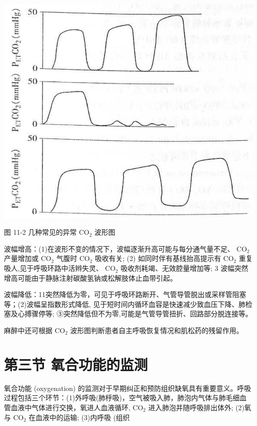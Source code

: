 \documentclass[10pt]{article}
\begin{document}
\begin{center}
\includegraphics[max width=\textwidth]{2024_07_09_002a177993bd97d1d6d7g-118(1)}
\end{center}

图 11-2 几种常见的异常 $\mathrm{CO}_{2}$ 波形图

波幅增高：(1)在波形不变的情况下，波幅逐渐升高可能与每分通气量不足、 $\mathrm{CO}_{2}$ 产量增加或 $\mathrm{CO}_{2}$ 气腹时 $\mathrm{CO}_{2}$ 吸收有关; (2) 如同时伴有基线抬高提示有 $\mathrm{CO}_{2}$ 重复吸人,见于呼吸环路中活辫失灵、 $\mathrm{CO}_{2}$ 吸收剂耗竭、无效腔量增加等; 3 波幅突然增高可能由于静脉注射碳酸氢钠或松解肢体止血带引起。

波幅降低：11突然降低为零，可见于呼吸环路断开、气管导管脱出或采样管阻塞等；(2)波幅呈指数形式降低, 见于短时间内循环血容是快速减少致血压下降、肺检塞及心搏骤停等; ③突然降低但不为零,可能是气管导管扭折、回路部分脱连接等。

麻醉中还可根据 $\mathrm{CO}_{2}$ 波形图判断患者自主呼吸恢复情况和肌松药的残留作用。

\section*{第三节 氧合功能的监测}
氧合功能 (oxygenation) 的监测对于早期纠正和预防组织缺氧具有重要意义。呼吸过程包括三个环节：(1)外呼吸(肺㭔吸)，空气被吸入肺，肺泡内气体与肺毛细血管血液中气体进行交换，氧进人血液循环, $\mathrm{CO}_{2}$ 进入肺泡并随呼吸排出体外; (2)氧与 $\mathrm{CO}_{2}$ 在血液中的运输; (3)内呼吸 (组织
\end{document}

